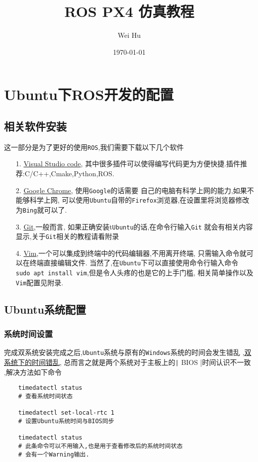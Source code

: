 \documentclass{article}
\begin{document}
\author{Wei Hu}
\date{\today}
\title{\textbf{ROS PX4 仿真教程}}

\maketitle

\section{Ubuntu下ROS开发的配置}
\subsection{相关软件安装}
这一部分是为了更好的使用\texttt{ROS},我们需要下载以下几个软件
\begin{itemize}
    \item [1.]\href{https://code.visualstudio.com/download}{Visual Studio code},
          其中很多插件可以使得编写代码更为方便快捷.插件推荐:C/C++,Cmake,Python,ROS.
    \item [2.]\href{https://www.google.com/chrome/}{Google Chrome},
          使用\texttt{Google}的话需要
          自己的电脑有科学上网的能力,如果不能够科学上网,
          可以使用\texttt{Ubuntu}自带的\texttt{Firefox}浏览器,在设置里将浏览器修改为\texttt{Bing}就可以了.
    \item [3.]\href{https://git-scm.com/downloads}{Git},一般而言,
          如果正确安装t\texttt{Ubuntu}的话,在命令行输入\texttt{Git}
          就会有相关内容显示,关于\texttt{Git}相关的教程请看附录
    \item [4.]\href{https://www.vim.org/download.php}{Vim},一个可以集成到终端中的代码编辑器,不用离开终端,
          只需输入命令就可以在终端直接编辑文件.
          当然了,在\texttt{Ubuntu}下可以直接使用命令行输入命令
          \texttt{sudo apt install vim},但是令人头疼的也是它的上手门槛,
          相关简单操作以及\texttt{Vim}配置见附录.
\end{itemize}
\subsection{Ubuntu系统配置}
\subsubsection{系统时间设置}
完成双系统安装完成之后,\texttt{Ubuntu}系统与原有的\texttt{Windows}系统的时间会发生错乱
,\href{URLhttps://zhuanlan.zhihu.com/p/492885761}{双系统下的时间错乱},
总而言之就是两个系统对于主板上的\texttt| BIOS |时间认识不一致
,解决方法如下命令
\begin{verbatim}
    timedatectl status 
    # 查看系统时间状态

    timedatectl set-local-rtc 1 
    # 设置Ubuntu系统时间与BIOS同步
    
    timedatectl status 
    # 此条命令可以不用输入,也是用于查看修改后的系统时间状态
    # 会有一个Warning输出.
\end{verbatim}
\end{document}
